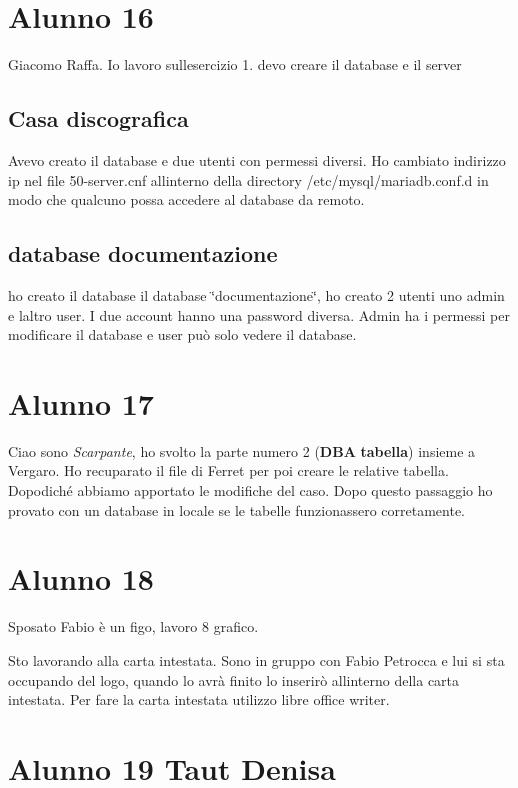 \section*{Alunno 16}

Giacomo Raffa. Io lavoro sull\textquotesingle{}esercizio 1. devo creare il database e il server \subsection*{Casa discografica}

Avevo creato il database e due utenti con permessi diversi. Ho cambiato indirizzo ip nel file 50-\/server.\+cnf all\textquotesingle{}interno della directory /etc/mysql/mariadb.conf.\+d in modo che qualcuno possa accedere al database da remoto. \subsection*{database documentazione}

ho creato il database il database \char`\"{}documentazione\char`\"{}, ho creato 2 utenti uno \textquotesingle{}admin\textquotesingle{} e l\textquotesingle{}altro \textquotesingle{}user\textquotesingle{}. I due account hanno una password diversa. Admin ha i permessi per modificare il database e user può solo vedere il database.

\section*{Alunno 17}

Ciao sono {\itshape Scarpante}, ho svolto la parte numero 2 ({\bfseries D\+BA} {\bfseries tabella}) insieme a Vergaro. Ho recuparato il file di Ferret per poi creare le relative tabella. Dopodiché abbiamo apportato le modifiche del caso. Dopo questo passaggio ho provato con un database in locale se le tabelle funzionassero corretamente. \section*{Alunno 18}

Sposato Fabio è un figo, lavoro 8 grafico.

Sto lavorando alla carta intestata. Sono in gruppo con Fabio Petrocca e lui si sta occupando del logo, quando lo avrà finito lo inserirò all\textquotesingle{}interno della carta intestata. Per fare la carta intestata utilizzo libre office writer. \section*{Alunno 19 Taut Denisa}

